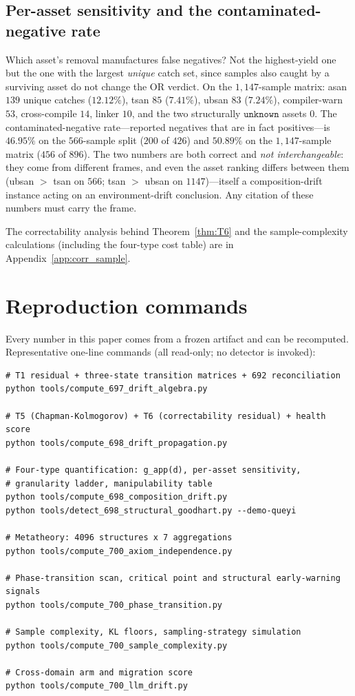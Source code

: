 \documentclass{article}
\newcommand{\unk}{\texttt{unknown}}
\begin{document}
\subsection{Per-asset sensitivity and the contaminated-negative rate}
\label{sec:sensitivity}

Which asset's removal manufactures false negatives? Not the highest-yield one but the one with the largest
\emph{unique} catch set, since samples also caught by a surviving asset do not change the OR verdict. On the
$1{,}147$-sample matrix: asan $139$ unique catches ($12.12\%$), tsan $85$ ($7.41\%$), ubsan $83$ ($7.24\%$),
compiler-warn $53$, cross-compile $14$, linker $10$, and the two structurally $\unk$ assets $0$. The
contaminated-negative rate---reported negatives that are in fact positives---is $46.95\%$ on the
$566$-sample split ($200$ of $426$) and $50.89\%$ on the $1{,}147$-sample matrix ($456$ of $896$). The two
numbers are both correct and \emph{not interchangeable}: they come from different frames, and even the
asset ranking differs between them (ubsan $>$ tsan on $566$; tsan $>$ ubsan on $1147$)---itself a
composition-drift instance acting on an environment-drift conclusion. Any citation of these numbers must
carry the frame.


The correctability analysis behind Theorem~\ref{thm:T6} and the sample-complexity
calculations (including the four-type cost table) are in Appendix~\ref{app:corr_sample}.


\section{Reproduction commands}
\label{app:repro}

Every number in this paper comes from a frozen artifact and can be recomputed. Representative one-line
commands (all read-only; no detector is invoked):

\begin{verbatim}
# T1 residual + three-state transition matrices + 692 reconciliation
python tools/compute_697_drift_algebra.py

# T5 (Chapman-Kolmogorov) + T6 (correctability residual) + health score
python tools/compute_698_drift_propagation.py

# Four-type quantification: g_app(d), per-asset sensitivity,
# granularity ladder, manipulability table
python tools/compute_698_composition_drift.py
python tools/detect_698_structural_goodhart.py --demo-queyi

# Metatheory: 4096 structures x 7 aggregations
python tools/compute_700_axiom_independence.py

# Phase-transition scan, critical point and structural early-warning signals
python tools/compute_700_phase_transition.py

# Sample complexity, KL floors, sampling-strategy simulation
python tools/compute_700_sample_complexity.py

# Cross-domain arm and migration score
python tools/compute_700_llm_drift.py
\end{verbatim}
\end{document}
